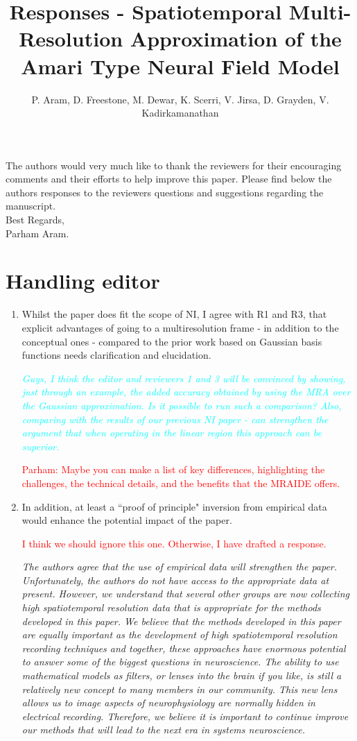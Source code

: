 \documentclass{article}
\title{Responses - Spatiotemporal Multi-Resolution Approximation of the Amari Type Neural Field Model}
\author{ P. Aram, D. Freestone, M. Dewar, K. Scerri, V. Jirsa, D. Grayden, V. Kadirkamanathan}
\newcommand{\dean}[1]{\textcolor{red}{#1}}
\newcommand{\ken}[1]{\textcolor{cyan}{#1}}
\begin{document}
    \maketitle

    The authors would very much like to thank the reviewers for their encouraging comments and their efforts to help improve this paper. Please find below the authors responses to the reviewers questions and suggestions regarding the manuscript. 
\\

Best Regards,
\\

Parham Aram.

\section{Handling editor}
\begin{enumerate}
\item Whilst the paper does fit the scope of NI, I agree with R1 and R3, that explicit advantages of going to a multiresolution frame - in addition to the conceptual ones - compared to the prior work based on Gaussian basis functions needs clarification and elucidation. 

\emph{\ken{Guys, I think the editor and reviewers 1 and 3 will be convinced by showing, just through an example, the added accuracy obtained by using the MRA over the Gaussian approximation. Is it possible to run such a comparison? Also, comparing with the results of our previous NI paper - can strengthen the argument that when operating in the linear region this approach can be superior.}}

\dean{Parham: Maybe you can make a list of key differences, highlighting the challenges, the technical details, and the benefits that the MRAIDE offers.}

\item  In addition, at least a ``proof of principle" inversion from empirical data would enhance the potential impact of the paper. 

\dean{I think we should ignore this one. Otherwise, I have drafted a response.}


\emph{The authors agree that the use of empirical data will strengthen the paper. Unfortunately, the authors do not have access to the appropriate data at present. However, we understand that several other groups are now collecting high spatiotemporal resolution data that is appropriate for the methods developed in this paper. We believe that the methods developed in this paper are equally important as the development of high spatiotemporal resolution recording techniques and together, these approaches have enormous potential to answer some of the biggest questions in neuroscience. The ability to use mathematical models as filters, or lenses into the brain if you like, is still a relatively new concept to many members in our community. This new lens allows us to image aspects of neurophysiology are normally hidden in electrical recording. Therefore, we believe it is important to continue improve our methods that will lead to the next era in systems neuroscience.} 
	
\end{enumerate}
\end{document}
